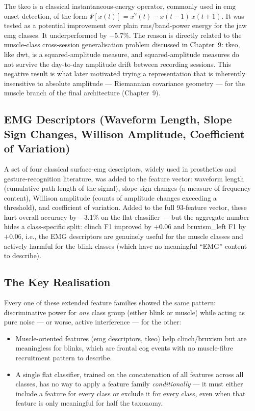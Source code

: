 The \acrshort{tkeo} is a classical instantaneous-energy
operator, commonly used in \acrshort{emg} onset detection, of
the form $\Psi[x(t)] = x^2(t) - x(t-1)\,x(t+1)$. It was tested
as a potential improvement over plain \acrshort{rms}/band-power
energy for the jaw \acrshort{emg} classes. It underperformed by
$-$5.7\%. The reason is directly related to the muscle-class
cross-session generalisation problem discussed in Chapter~9:
\acrshort{tkeo}, like \acrshort{dwt}, is a squared-amplitude
measure, and squared-amplitude measures do not survive the
day-to-day amplitude drift between recording sessions. This
negative result is what later motivated trying a
representation that is inherently insensitive to absolute
amplitude --- Riemannian covariance geometry --- for the muscle
branch of the final architecture (Chapter~9).

\subsection{EMG Descriptors (Waveform Length, Slope Sign
Changes, Willison Amplitude, Coefficient of Variation)}

A set of four classical surface-\acrshort{emg} descriptors,
widely used in prosthetics and gesture-recognition literature,
was added to the feature vector: waveform length (cumulative
path length of the signal), slope sign changes (a measure of
frequency content), Willison amplitude (counts of amplitude
changes exceeding a threshold), and coefficient of variation.
Added to the full 93-feature vector, these hurt overall
accuracy by $-$3.1\% on the flat classifier --- but the
aggregate number hides a class-specific split: clinch F1
improved by $+$0.06 and bruxism\_left F1 by $+$0.06, i.e., the
EMG descriptors are genuinely useful for the muscle classes and
actively harmful for the blink classes (which have no
meaningful ``EMG'' content to describe).

\subsection{The Key Realisation}

Every one of these extended feature families showed the same
pattern: discriminative power for \emph{one} class group
(either blink or muscle) while acting as pure noise --- or
worse, active interference --- for the other:

\begin{itemize}[leftmargin=*]
    \item Muscle-oriented features (\acrshort{emg} descriptors,
    \acrshort{tkeo}) help clinch/bruxism but are meaningless
    for blinks, which are frontal \acrshort{eog} events with no
    muscle-fibre recruitment pattern to describe.
    \item A single flat classifier, trained on the concatenation
    of all features across all classes, has no way to apply a
    feature family \emph{conditionally} --- it must either
    include a feature for every class or exclude it for every
    class, even when that feature is only meaningful for half
    the taxonomy.
\end{itemize}

